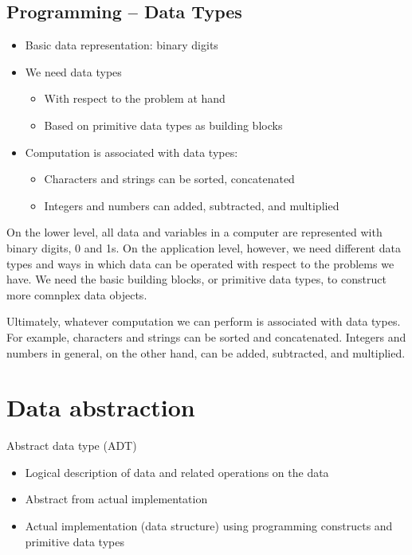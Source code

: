\documentclass[
  letterpaper,
]{scrbook}
\providecommand{\tightlist}{%
  \setlength{\itemsep}{0pt}\setlength{\parskip}{0pt}}
\begin{document}
\subsection*{Programming -- Data Types}\label{programming-data-types}

\begin{itemize}
\tightlist
\item
  Basic data representation: binary digits
\item
  We need data types

  \begin{itemize}
  \tightlist
  \item
    With respect to the problem at hand
  \item
    Based on primitive data types as building blocks
  \end{itemize}
\item
  Computation is associated with data types:

  \begin{itemize}
  \tightlist
  \item
    Characters and strings can be sorted, concatenated
  \item
    Integers and numbers can added, subtracted, and multiplied
  \end{itemize}
\end{itemize}

On the lower level, all data and variables in a computer are represented
with binary digits, 0 and 1s. On the application level, however, we need
different data types and ways in which data can be operated with respect
to the problems we have. We need the basic building blocks, or primitive
data types, to construct more comnplex data objects.

Ultimately, whatever computation we can perform is associated with data
types. For example, characters and strings can be sorted and
concatenated. Integers and numbers in general, on the other hand, can be
added, subtracted, and multiplied.

\section*{Data abstraction}\label{data-abstraction}


Abstract data type (ADT)

\begin{itemize}
\tightlist
\item
  Logical description of data and related operations on the data
\item
  Abstract from actual implementation
\item
  Actual implementation (data structure) using programming constructs
  and primitive data types
\end{itemize}
\end{document}
